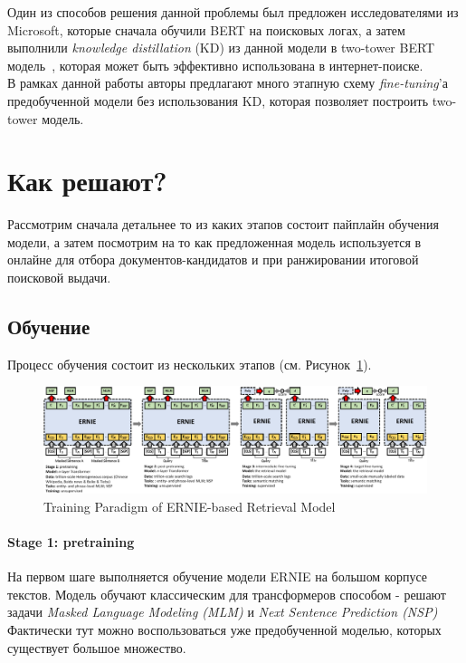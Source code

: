 Один из способов решения данной проблемы был предложен исследователями из Microsoft, которые сначала обучили BERT на поисковых логах, а затем выполнили \textit{knowledge distillation} (KD) из данной модели в two-tower BERT модель~\cite{lu2020twinbert}, которая может быть эффективно использована в интернет-поиске. \\

В рамках данной работы авторы предлагают много этапную схему \textit{fine-tuning}'а предобученной модели без использования KD, которая позволяет построить two-tower модель.

\section*{Как решают?}

Рассмотрим сначала детальнее то из каких этапов состоит пайплайн обучения модели, а затем посмотрим на то как предложенная модель используется в онлайне для отбора документов-кандидатов и при ранжировании итоговой поисковой выдачи.

\subsection*{Обучение}

Процесс обучения состоит из нескольких этапов (см. Рисунок~\ref{fig:baidu_training_pipeline}).

\begin{figure}[ht]
  \centering
  \includegraphics[width=1.1\linewidth]{figures/baidu-training-pipeline.pdf}
  \caption{\footnotesize{Training Paradigm of ERNIE-based Retrieval Model}}
  \label{fig:baidu_training_pipeline}
\end{figure}

\paragraph{Stage 1: pretraining} На первом шаге выполняется обучение модели ERNIE на большом корпусе текстов.
Модель обучают классическим для трансформеров способом - решают задачи \textit{Masked Language Modeling (MLM)} и \textit{Next Sentence Prediction (NSP)}
Фактически тут можно воспользоваться уже предобученной моделью, которых существует большое множество.

